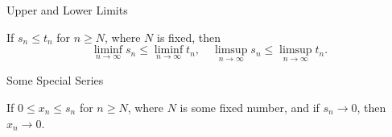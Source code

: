 \documentclass{beamer}
\begin{document}
\begin{frame}{Upper and Lower Limits} 

\begin{theorem}
If $s_n \leq t_n$ for $n \geq N$, where $N$ is fixed, then
\[
\liminf_{n \to \infty} s_n \leq \liminf_{n \to \infty} t_n, \quad
\limsup_{n \to \infty} s_n \leq \limsup_{n \to \infty} t_n.
\]
\end{theorem}
\end{frame}


\begin{frame}{Some Special Series}
  \begin{remark}
    If $0 \leq x_n \leq s_n$ for $n \geq N$, where $N$ is some fixed number, and
    if $s_n \to 0$, then $x_n \to 0$.
  \end{remark}
\end{frame}
\end{document}
